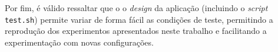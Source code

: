 \documentclass[12pt,a4paper]{article}
\begin{document}
Por fim, é válido ressaltar que o o \textit{design} da aplicação (incluindo o
\textit{script} \texttt{test.sh}) permite variar de forma fácil as condições de
teste, permitindo a reprodução dos experimentos apresentados neste trabalho e
facilitando a experimentação com novas configurações. 






\end{document}
